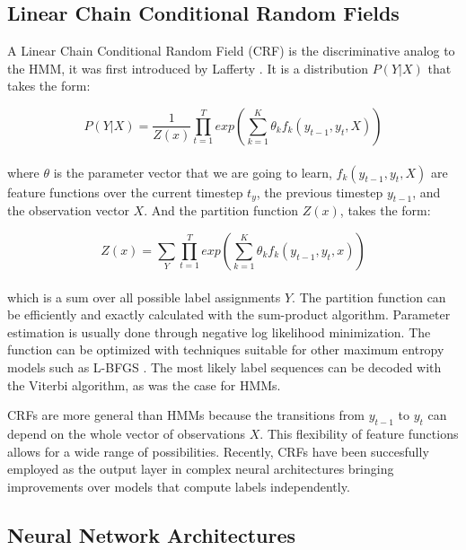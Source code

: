 \documentclass{nle}
\begin{document}
\subsection{Linear Chain Conditional Random Fields}

A Linear Chain Conditional Random Field (CRF) is the discriminative analog to the HMM,
it was first introduced by Lafferty \cite{Lafferty2001}. It is a distribution $ P(Y|X) $ that takes the form:

\begin{equation}
P(Y|X) = \frac{1}{Z(x)} \prod_{t=1}^{T} exp \left( \sum_{k=1}^{K} \theta_k f_k(y_{t-1}, y_t, X) \right)
\end{equation}
\\

where $ \theta $ is the parameter vector that we are going to learn, $ f_k(y_{t-1}, y_{t}, X) $ 
are feature functions over the current timestep $ t_y $, the previous timestep $ y_{t-1}$, 
and the observation vector $ X $. And the partition function $ Z(x) $, takes the form:

\begin{equation}
Z(x) = \sum_{Y} \prod_{t=1}^{T} exp \left( \sum_{k=1}^{K} \theta_k f_k(y_{t-1}, y_t, x) \right)
\end{equation}
\\

which is a sum over all possible label assignments $ Y $. The partition function can be efficiently
and exactly calculated with the sum-product algorithm. Parameter estimation is usually done through 
negative log likelihood minimization. The function can be optimized with techniques suitable for other 
maximum entropy models such as L-BFGS \cite{Liu1989}. The most likely label sequences can be decoded 
with the Viterbi algorithm, as was the case for HMMs.

CRFs are more general than HMMs because the transitions from $ y_{t-1} $ to $ y_{t} $ can depend 
on the whole vector of observations $ X $. This flexibility of feature functions allows for a wide range of
possibilities. Recently, CRFs have been succesfully employed as the output layer in complex neural 
architectures bringing improvements over models that compute labels independently.

\subsection{Neural Network Architectures}
\end{document}
